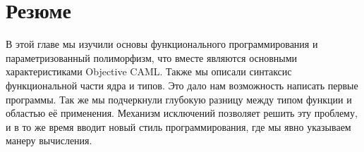 \section{Резюме}

В этой главе мы изучили основы функционального программирования и
параметризованный полиморфизм, что вместе являются основными характеристиками
Objective CAML. Также мы описали синтаксис функциональной части ядра и типов.
Это дало нам возможность написать первые программы. Так же мы подчеркнули
глубокую разницу между типом функции и областью её применения. Механизм
исключений позволяет решить эту проблему, и в то же время вводит новый стиль
программирования, где мы явно указываем манеру вычисления.

